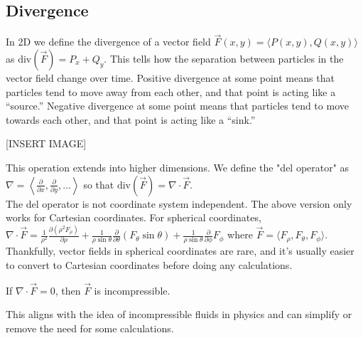 \subsection{Divergence}
\noindent
In 2D we define the divergence of a vector field $\vec{F}(x,y) = \langle P(x,y), Q(x,y) \rangle$ as $\text{div}(\vec{F}) = P_x+Q_y$. This tells how the separation between particles in the vector field change over time. Positive divergence at some point means that particles tend to move away from each other, and that point is acting like a “source.” Negative divergence at some point means that particles tend to move towards each other, and that point is acting like a “sink.”

[INSERT IMAGE]

\noindent
This operation extends into higher dimensions. We define the "del operator" as\\
$\nabla = \left< \frac{\partial}{\partial x}, \frac{\partial}{\partial y},\ldots\right>$ so that $\text{div}(\vec{F}) = \nabla \cdot \vec{F}$.\\
The del operator is not coordinate system independent. The above version only works for Cartesian coordinates. For spherical coordinates,\\
$\nabla \cdot \vec{F} = \frac{1}{\rho^2}\frac{\partial(\rho^2 F_\rho)}{\partial\rho} + \frac{1}{\rho\sin{\theta}}\frac{\partial}{\partial\theta}(F_\theta \sin{\theta}) + \frac{1}{\rho\sin{\theta}}\frac{\partial}{\partial\phi}F_\phi$ where $\vec{F} = \langle F_\rho, F_\theta, F_\phi \rangle$.\\
Thankfully, vector fields in spherical coordinates are rare, and it's usually easier to convert to Cartesian coordinates before doing any calculations.\\

\begin{definition}
	If $\nabla \cdot \vec{F} = 0$, then $\vec{F}$ is incompressible.
\end{definition}
\noindent
This aligns with the idea of incompressible fluids in physics and can simplify or remove the need for some calculations.

